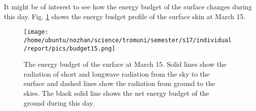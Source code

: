 \documentclass[a4paper,12pt]{article}
\numberwithin{equation}{section} %
\begin{document}

It might be of interest to see how the energy budget of the surface changes during this day. Fig. \ref{budget15} shows the energy budget profile of the surface skin at March 15.

\vspace{0.35cm}

\begin{figure}[bhp]
\texttt{[image: /home/ubuntu/nozhan/science/tromuni/semester/s17/individual/report/pics/budget15.png]}
\caption{The energy budget of the surface at March 15. Solid lines show the radiation of short and longwave radiation from the sky to the surface and dashed lines show the radiation from ground to the skies. The black solid line shows the net energy budget of the ground during this day.}
\label{budget15}
\end{figure}
\end{document}
